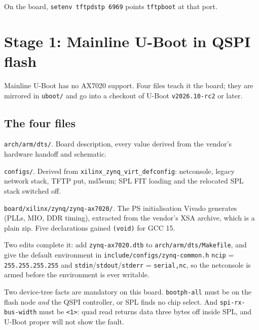 \documentclass[11pt,a4paper,oneside]{article}
\newcommand{\file}[1]{{\color{bluemid}\nolinkurl{#1}}}
\newcommand{\cmd}[1]{\texttt{#1}}
\newcommand{\repo}{https://github.com/MaxClerkwell/ax7020-bringup}
\newcommand{\rfile}[1]{\href{\repo/blob/master/#1}{\color{bluemid}\nolinkurl{#1}}}
\begin{document}
On the board, \cmd{setenv tftpdstp 6969} points \cmd{tftpboot} at that port.

\section{Stage 1: Mainline U-Boot in QSPI flash}

Mainline U-Boot has no AX7020 support. Four files teach it the board; they
are mirrored in \file{uboot/} and go into a checkout of U-Boot
\cmd{v2026.10-rc2} or later.

\subsection{The four files}

\begin{filelist}
  \item[\rfile{uboot/zynq-ax7020.dts}] \file{arch/arm/dts/}. Board description, every value derived from the vendor's hardware handoff and schematic.
  \item[\rfile{uboot/alinx_ax7020_defconfig}] \file{configs/}. Derived from \cmd{xilinx\_zynq\_virt\_defconfig}: netconsole, legacy network stack, TFTP put, md5sum; SPL FIT loading and the relocated SPL stack switched off.
  \item[\rfile{uboot/ps7_init_gpl.c}, \file{.h}] \file{board/xilinx/zynq/zynq-ax7020/}. The PS initialisation Vivado generates (PLLs, MIO, DDR timing), extracted from the vendor's XSA archive, which is a plain zip. Five declarations gained \cmd{(void)} for GCC 15.
\end{filelist}

Two edits complete it: add \cmd{zynq-ax7020.dtb} to
\file{arch/arm/dts/Makefile}, and give the default environment in
\file{include/configs/zynq-common.h} \cmd{ncip} = \cmd{255.255.255.255} and
\cmd{stdin}/\cmd{stdout}/\cmd{stderr} = \cmd{serial,nc}, so the netconsole is
armed before the environment is ever writable.

\begin{mustknow}
Two device-tree facts are mandatory on this board. \cmd{bootph-all} must be
on the flash node \emph{and} the QSPI controller, or SPL finds no chip select.
And \cmd{spi-rx-bus-width} must be \cmd{<1>}: quad read returns data three
bytes off inside SPL, and U-Boot proper will not show the fault.
\end{mustknow}
\end{document}

